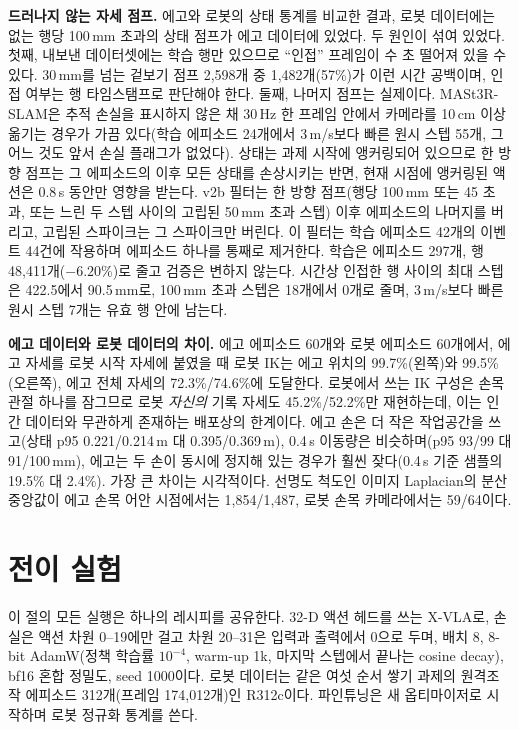 \documentclass[conference,10pt]{IEEEtran}
\newcommand{\mm}{\,mm\xspace}
\begin{document}
\textbf{드러나지 않는 자세 점프.} 에고와 로봇의 상태 통계를 비교한 결과, 로봇 데이터에는 없는 행당 100\mm 초과의 상태 점프가 에고
데이터에 있었다. 두 원인이 섞여 있었다. 첫째, 내보낸 데이터셋에는 학습 행만 있으므로 ``인접'' 프레임이 수 초 떨어져 있을 수 있다.
30\mm{}를 넘는 겉보기 점프 2{,}598개 중 1{,}482개(57\%)가 이런 시간 공백이며, 인접 여부는 행 타임스탬프로 판단해야 한다. 둘째, 나머지
점프는 실제이다. MASt3R-SLAM은 추적 손실을 표시하지 않은 채 30\,Hz 한 프레임 안에서 카메라를 10\,cm 이상 옮기는 경우가 가끔 있다(학습
에피소드 24개에서 3\,m/s보다 빠른 원시 스텝 55개, 그 어느 것도 앞서 손실 플래그가 없었다). 상태는 과제 시작에 앵커링되어 있으므로 한
방향 점프는 그 에피소드의 이후 모든 상태를 손상시키는 반면, 현재 시점에 앵커링된 액션은 0.8\,s 동안만 영향을 받는다. v2b 필터는 한 방향
점프(행당 100\mm 또는 45\textdegree{} 초과, 또는 느린 두 스텝 사이의 고립된 50\mm 초과 스텝) 이후 에피소드의 나머지를 버리고, 고립된
스파이크는 그 스파이크만 버린다. 이 필터는 학습 에피소드 42개의 이벤트 44건에 작용하며 에피소드 하나를 통째로 제거한다. 학습은 에피소드
297개, 행 48{,}411개($-6.20$\%)로 줄고 검증은 변하지 않는다. 시간상 인접한 행 사이의 최대 스텝은 422.5에서 90.5\mm{}로, 100\mm 초과
스텝은 18개에서 0개로 줄며, 3\,m/s보다 빠른 원시 스텝 7개는 유효 행 안에 남는다.

\textbf{에고 데이터와 로봇 데이터의 차이.} 에고 에피소드 60개와 로봇 에피소드 60개에서, 에고 자세를 로봇 시작 자세에 붙였을 때 로봇
IK는 에고 위치의 99.7\%(왼쪽)와 99.5\%(오른쪽), 에고 전체 자세의 72.3\%/74.6\%에 도달한다. 로봇에서 쓰는 IK 구성은 손목 관절 하나를
잠그므로 로봇 \emph{자신의} 기록 자세도 45.2\%/52.2\%만 재현하는데, 이는 인간 데이터와 무관하게 존재하는 배포상의 한계이다. 에고 손은
더 작은 작업공간을 쓰고(상태 p95 0.221/0.214\,m 대 0.395/0.369\,m), 0.4\,s 이동량은 비슷하며(p95 93/99 대 91/100\mm), 에고는 두 손이
동시에 정지해 있는 경우가 훨씬 잦다(0.4\,s 기준 샘플의 19.5\% 대 2.4\%). 가장 큰 차이는 시각적이다. 선명도 척도인 이미지 Laplacian의
분산 중앙값이 에고 손목 어안 시점에서는 1{,}854/1{,}487, 로봇 손목 카메라에서는 59/64이다.

\section{전이 실험}\label{sec:transfer}
이 절의 모든 실행은 하나의 레시피를 공유한다. 32-D 액션 헤드를 쓰는 X-VLA로, 손실은 액션 차원 0--19에만 걸고 차원 20--31은 입력과
출력에서 0으로 두며, 배치 8, 8-bit AdamW(정책 학습률 $10^{-4}$, warm-up 1k, 마지막 스텝에서 끝나는 cosine decay), bf16 혼합 정밀도,
seed 1000이다. 로봇 데이터는 같은 여섯 순서 쌓기 과제의 원격조작 에피소드 312개(프레임 174{,}012개)인 R312c이다. 파인튜닝은 새
옵티마이저로 시작하며 로봇 정규화 통계를 쓴다.
\end{document}
